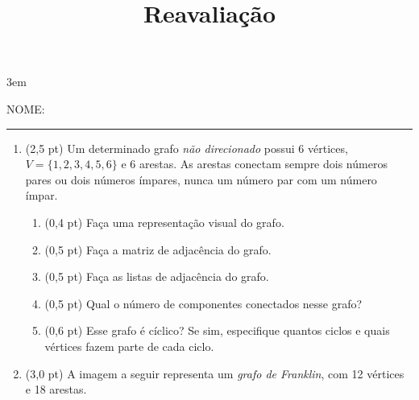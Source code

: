 \documentclass[a4paper,10pt]{article}
\title{Reavaliação}
\begin{document}
\maketitle

\emergencystretch 3em



NOME: \rule{.85\textwidth}{0.1mm}

\begin{multicols*}{2}
\setlength{\leftmargini}{0pt}
\begin{enumerate}
  \item (2,5 pt) Um determinado grafo \textit{não direcionado} possui 6 vértices, $V = \{1, 2, 3, 4, 5, 6\}$ e 6 arestas. As arestas conectam sempre dois números pares ou dois números ímpares, nunca um número par com um número ímpar.

  \begin{enumerate}
    \item (0,4 pt) Faça uma representação visual do grafo.
    \item (0,5 pt) Faça a matriz de adjacência do grafo.
    \item (0,5 pt) Faça as listas de adjacência do grafo.
    \item (0,5 pt) Qual o número de componentes conectados nesse grafo? %
    \item (0,6 pt) Esse grafo é cíclico? Se sim, especifique quantos ciclos e quais vértices fazem parte de cada ciclo. %
  \end{enumerate}

  \item (3,0 pt) A imagem a seguir representa um \textit{grafo de Franklin}, com 12 vértices e 18 arestas.

  \begin{center}
\end{center}
\end{enumerate}
\end{multicols*}
\end{document}
